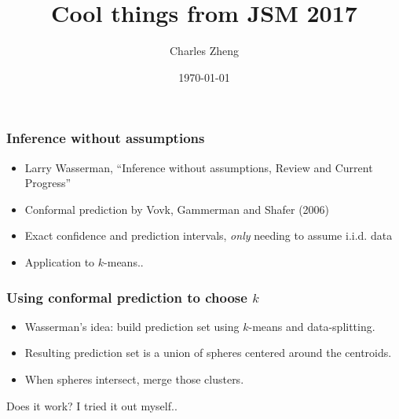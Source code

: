 \documentclass{beamer}
\title[JSM 2017]{Cool things from JSM 2017}
\author{Charles Zheng} %
\institute[NIMH] %
{National Institute of Mental Health}
\date{\today} %
\begin{document}
\begin{frame}
\titlepage %
\end{frame}

\begin{frame}
\frametitle{Inference without assumptions}
\begin{itemize}
\item Larry Wasserman, ``Inference without assumptions, Review and Current Progress''
\item Conformal prediction by Vovk, Gammerman and Shafer (2006)
\item Exact confidence and prediction intervals, \emph{only} needing to assume i.i.d. data
\item Application to $k$-means..
\end{itemize}
\end{frame}

\begin{frame}
\frametitle{Using conformal prediction to choose $k$}
\begin{itemize}
\item Wasserman's idea: build prediction set using $k$-means and data-splitting. 
\item Resulting prediction set is a union of spheres centered around the centroids.
\item When spheres intersect, merge those clusters.
\end{itemize}
Does it work?  I tried it out myself..
\end{frame}
\end{document}
